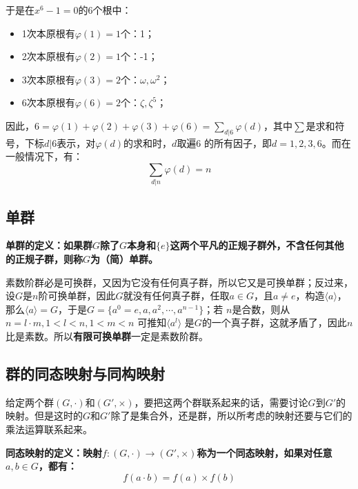 \documentclass[12pt]{article}
\begin{document}
于是在$x^6-1=0$的6个根中：
\begin{itemize}
\setlength{\itemsep}{0pt}
\setlength{\parsep}{0pt}
\setlength{\parskip}{0pt}
	\item 1次本原根有$\varphi(1) = 1$个：1；
	\item 2次本原根有$\varphi(2) = 1$个：-1；
	\item 3次本原根有$\varphi(3) = 2$个：$\omega, \omega^2$；
	\item 6次本原根有$\varphi(6) = 2$个：$\zeta, \zeta^5$；
\end{itemize}

因此，$6 = \varphi(1) + \varphi(2) + \varphi(3) + \varphi(6) = \sum_{d|6}\varphi(d)$，其中$\sum$是求和符号，下标$d|6$表示，对$\varphi(d)$的求和时，$d$取遍6 的所有因子，即$d = 1, 2, 3, 6$。而在一般情况下，有：
$$
\sum_{d|n} \varphi(d) = n
$$

\subsection{单群}
\begin{mdframed}[
linecolor=black!40,outerlinewidth=1pt,roundcorner=.5em,innertopmargin=1ex,innerbottommargin=.5\baselineskip,innerrightmargin=1em,innerleftmargin=1em,backgroundcolor=gray!5,
]
\textbf{
单群的定义：如果群$G$除了$G$本身和$\{e\}$这两个平凡的正规子群外，不含任何其他的正规子群，则称$G$为（简）单群。
}
\end{mdframed}

素数阶群必是可换群，又因为它没有任何真子群，所以它又是可换单群；反过来，设$G$是$n$阶可换单群，因此$G$就没有任何真子群，任取$a \in G$，且$a \neq e$，构造$\langle a \rangle$，那么$\langle a \rangle = G$，于是$G = \{a^0=e, a, a^2, \cdots, a^{n-1}\}$；若 $n$是合数，则从$n = l \cdot m, 1 < l < n, 1 < m < n$ 可推知$\langle a^l \rangle$ 是$G$的一个真子群，这就矛盾了，因此$n$比是素数。所以\textbf{有限可换单群}一定是素数阶群。

\subsection{群的同态映射与同构映射}
给定两个群$(G, \cdot)$和$(G', \times)$，要把这两个群联系起来的话，需要讨论$G$到$G'$的映射。但是这时的$G$和$G'$除了是集合外，还是群，所以所考虑的映射还要与它们的乘法运算联系起来。
\begin{mdframed}[
linecolor=black!40,outerlinewidth=1pt,roundcorner=.5em,innertopmargin=1ex,innerbottommargin=.5\baselineskip,innerrightmargin=1em,innerleftmargin=1em,backgroundcolor=gray!5,
]
\textbf{
同态映射的定义：映射$f: (G, \cdot) \rightarrow (G', \times) $称为一个同态映射，如果对任意$a, b \in G$，都有：
$$
f(a\cdot b) = f(a) \times f(b)
$$
}
\end{mdframed}
\end{document}
